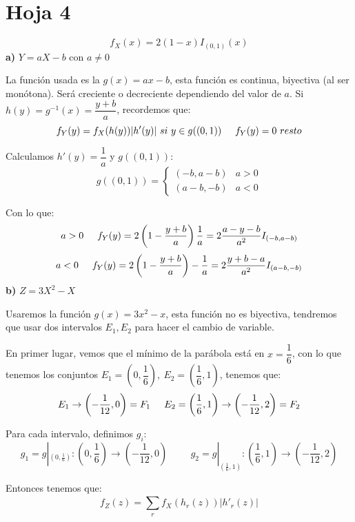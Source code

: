 \documentclass[openany]{book}
\begin{document}
\chapter{Hoja 4}

\begin{exercise}
    $$ f_{X} (x) = 2(1-x) I_{(0,1)}(x) $$
    \textbf{a)} $ Y = aX-b $ con $ a \ne 0 $

    La función usada es la $ g(x) = ax-b $, esta función es continua, biyectiva (al ser monótona). Será creciente o decreciente dependiendo del valor de $ a $. Si $ h(y) = g ^{-1}(x) = \dfrac{y+b}{a} $, recordemos que:
    $$ f_{Y}(y) = f_{X}(h(y)) |h'(y)|\ si\ y \in g((0,1))\hspace{5mm}f_{Y}(y) = 0\ resto $$

    Calculamos $ h'(y) = \dfrac{1}{a} $ y $ g((0,1)) $:
    $$ g((0,1)) = \left\{
    \begin{array}{ll}
        (-b,a-b) & a>0\\
        (a-b,-b) & a<0
    \end{array}
    \right. $$
    
    Con lo que:
    $$ a > 0\hspace{5mm}f_{Y}(y) = 2\left(1-\dfrac{y+b}{a}\right)\dfrac{1}{a} = 2 \dfrac{a-y-b}{a^2}I_{(-b,a-b)} $$
    $$ a < 0\hspace{5mm}f_{Y}(y) = 2\left(1-\dfrac{y+b}{a}\right)-\dfrac{1}{a} = 2 \dfrac{y+b-a}{a^2}I_{(a-b,-b)} $$
    \textbf{b)} $ Z = 3X^2-X $

    Usaremos la función $ g(x) = 3x^2-x $, esta función no es biyectiva, tendremos que usar dos intervalos $ E_1,E_2 $ para hacer el cambio de variable.


    En primer lugar, vemos que el mínimo de la parábola está en $ x = \dfrac{1}{6} $, con lo que tenemos los conjuntos $ E_1 = \left(0,\dfrac{1}{6}\right),\ E_2 = \left(\dfrac{1}{6},1\right) $, tenemos que:
    $$ E_1 \to \left(-\dfrac{1}{12},0\right) = F_1 \hspace{5mm}E_2 = \left(\dfrac{1}{6},1\right) \to \left(-\dfrac{1}{12},2\right) = F_2 $$

    Para cada intervalo, definimos $ g_i $:
    $$ g_1 = g|_{(0,\frac{1}{6})}:\left(0,\dfrac{1}{6}\right) \to \left(-\dfrac{1}{12},0\right) \hspace{1cm} g_2 = g|_{(\frac{1}{6},1)}:\left(\dfrac{1}{6},1\right) \to \left(-\dfrac{1}{12},2\right)$$

    Entonces tenemos que:
    $$ f_{Z}(z) = \sum\limits_{r}^{} f_{X}(h_{r}(z)) |h'_{r}(z)|  $$
    

\end{exercise}
\end{document}

